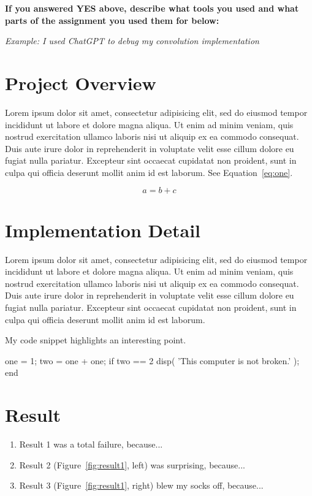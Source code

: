 \textbf{If you answered YES above, describe what tools you used and what parts of the assignment you used them for below:}

\textit{Example: I used ChatGPT to debug my convolution implementation}



\section*{Project Overview}

Lorem ipsum dolor sit amet, consectetur adipisicing elit, sed do eiusmod tempor incididunt ut labore et dolore magna aliqua. Ut enim ad minim veniam, quis nostrud exercitation ullamco laboris nisi ut aliquip ex ea commodo consequat. Duis aute irure dolor in reprehenderit in voluptate velit esse cillum dolore eu fugiat nulla pariatur. Excepteur sint occaecat cupidatat non proident, sunt in culpa qui officia deserunt mollit anim id est laborum. See Equation~\ref{eq:one}.

\begin{equation}
a = b + c
\label{eq:one}
\end{equation}

\section*{Implementation Detail}

Lorem ipsum dolor sit amet, consectetur adipisicing elit, sed do eiusmod tempor incididunt ut labore et dolore magna aliqua. Ut enim ad minim veniam, quis nostrud exercitation ullamco laboris nisi ut aliquip ex ea commodo consequat. Duis aute irure dolor in reprehenderit in voluptate velit esse cillum dolore eu fugiat nulla pariatur. Excepteur sint occaecat cupidatat non proident, sunt in culpa qui officia deserunt mollit anim id est laborum.

My code snippet highlights an interesting point.
\begin{python}
one = 1;
two = one + one;
if two == 2
    disp( 'This computer is not broken.' );
end
\end{python}

\section*{Result}

\begin{enumerate}
    \item Result 1 was a total failure, because...
    \item Result 2 (Figure~\ref{fig:result1}, left) was surprising, because...
    \item Result 3 (Figure~\ref{fig:result1}, right) blew my socks off, because...
\end{enumerate}

